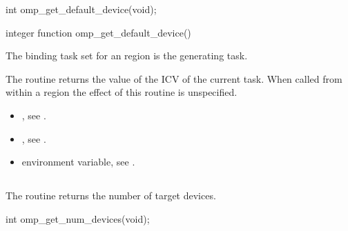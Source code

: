 \format
\begin{ccppspecific}
\begin{ompcFunction}
int omp_get_default_device(void);
\end{ompcFunction}
\end{ccppspecific}

\begin{fortranspecific}
\begin{ompfFunction}
integer function omp_get_default_device()
\end{ompfFunction}
\end{fortranspecific}

\binding
The binding task set for an  region is the generating 
task. 

\effect
The  routine returns the value of the  
ICV of the current task. When called from within a  region the effect of this 
routine is unspecified.

\crossreferences
\begin{itemize}
\item {}, see 
.

\item {}, see 
.

\item {} environment variable, see 
. 
\end{itemize}











\subsection{}
\label{subsec:omp_get_num_devices}
\summary
The  routine returns the number of target devices.

\format
\begin{ccppspecific}
\begin{ompcFunction}
int omp_get_num_devices(void);
\end{ompcFunction}
\end{ccppspecific}


